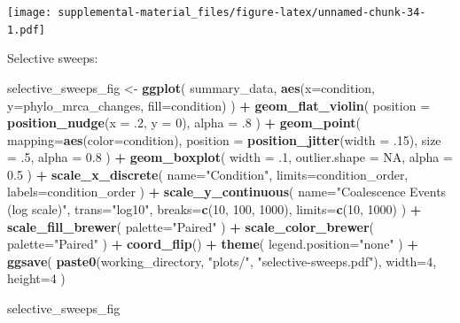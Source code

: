 \documentclass[]{book}
\newenvironment{Shaded}{\begin{snugshade}}{\end{snugshade}}
\newcommand{\DataTypeTok}[1]{\textcolor[rgb]{0.13,0.29,0.53}{#1}}
\newcommand{\DecValTok}[1]{\textcolor[rgb]{0.00,0.00,0.81}{#1}}
\newcommand{\FloatTok}[1]{\textcolor[rgb]{0.00,0.00,0.81}{#1}}
\newcommand{\KeywordTok}[1]{\textcolor[rgb]{0.13,0.29,0.53}{\textbf{#1}}}
\newcommand{\NormalTok}[1]{#1}
\newcommand{\OperatorTok}[1]{\textcolor[rgb]{0.81,0.36,0.00}{\textbf{#1}}}
\newcommand{\OtherTok}[1]{\textcolor[rgb]{0.56,0.35,0.01}{#1}}
\newcommand{\StringTok}[1]{\textcolor[rgb]{0.31,0.60,0.02}{#1}}
\begin{document}
\texttt{[image: supplemental-material\_files/figure-latex/unnamed-chunk-34-1.pdf]}

Selective sweeps:

\begin{Shaded}
\begin{Highlighting}[]
\NormalTok{selective_sweeps_fig <-}\StringTok{ }\KeywordTok{ggplot}\NormalTok{(}
\NormalTok{    summary_data,}
    \KeywordTok{aes}\NormalTok{(}\DataTypeTok{x=}\NormalTok{condition, }\DataTypeTok{y=}\NormalTok{phylo_mrca_changes, }\DataTypeTok{fill=}\NormalTok{condition)}
\NormalTok{  ) }\OperatorTok{+}
\StringTok{  }\KeywordTok{geom_flat_violin}\NormalTok{(}
    \DataTypeTok{position =} \KeywordTok{position_nudge}\NormalTok{(}\DataTypeTok{x =} \FloatTok{.2}\NormalTok{, }\DataTypeTok{y =} \DecValTok{0}\NormalTok{),}
    \DataTypeTok{alpha =} \FloatTok{.8}
\NormalTok{  ) }\OperatorTok{+}
\StringTok{  }\KeywordTok{geom_point}\NormalTok{(}
    \DataTypeTok{mapping=}\KeywordTok{aes}\NormalTok{(}\DataTypeTok{color=}\NormalTok{condition),}
    \DataTypeTok{position =} \KeywordTok{position_jitter}\NormalTok{(}\DataTypeTok{width =} \FloatTok{.15}\NormalTok{),}
    \DataTypeTok{size =} \FloatTok{.5}\NormalTok{,}
    \DataTypeTok{alpha =} \FloatTok{0.8}
\NormalTok{  ) }\OperatorTok{+}
\StringTok{  }\KeywordTok{geom_boxplot}\NormalTok{(}
    \DataTypeTok{width =} \FloatTok{.1}\NormalTok{,}
    \DataTypeTok{outlier.shape =} \OtherTok{NA}\NormalTok{,}
    \DataTypeTok{alpha =} \FloatTok{0.5}
\NormalTok{  ) }\OperatorTok{+}
\StringTok{  }\KeywordTok{scale_x_discrete}\NormalTok{(}
    \DataTypeTok{name=}\StringTok{"Condition"}\NormalTok{,}
    \DataTypeTok{limits=}\NormalTok{condition_order,}
    \DataTypeTok{labels=}\NormalTok{condition_order}
\NormalTok{  ) }\OperatorTok{+}
\StringTok{  }\KeywordTok{scale_y_continuous}\NormalTok{(}
    \DataTypeTok{name=}\StringTok{"Coalescence Events (log scale)"}\NormalTok{,}
    \DataTypeTok{trans=}\StringTok{"log10"}\NormalTok{,}
    \DataTypeTok{breaks=}\KeywordTok{c}\NormalTok{(}\DecValTok{10}\NormalTok{, }\DecValTok{100}\NormalTok{, }\DecValTok{1000}\NormalTok{),}
    \DataTypeTok{limits=}\KeywordTok{c}\NormalTok{(}\DecValTok{10}\NormalTok{, }\DecValTok{1000}\NormalTok{)}
\NormalTok{  ) }\OperatorTok{+}
\StringTok{  }\KeywordTok{scale_fill_brewer}\NormalTok{(}
    \DataTypeTok{palette=}\StringTok{"Paired"}
\NormalTok{  ) }\OperatorTok{+}
\StringTok{  }\KeywordTok{scale_color_brewer}\NormalTok{(}
    \DataTypeTok{palette=}\StringTok{"Paired"}
\NormalTok{  ) }\OperatorTok{+}
\StringTok{  }\KeywordTok{coord_flip}\NormalTok{() }\OperatorTok{+}
\StringTok{  }\KeywordTok{theme}\NormalTok{(}
    \DataTypeTok{legend.position=}\StringTok{"none"}
\NormalTok{  ) }\OperatorTok{+}
\StringTok{  }\KeywordTok{ggsave}\NormalTok{(}
    \KeywordTok{paste0}\NormalTok{(working_directory, }\StringTok{"plots/"}\NormalTok{, }\StringTok{"selective-sweeps.pdf"}\NormalTok{),}
    \DataTypeTok{width=}\DecValTok{4}\NormalTok{,}
    \DataTypeTok{height=}\DecValTok{4}
\NormalTok{  )}

\NormalTok{selective_sweeps_fig}
\end{Highlighting}
\end{Shaded}
\end{document}
